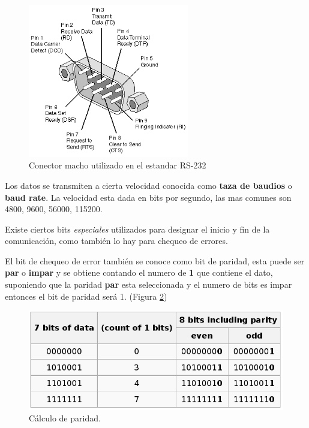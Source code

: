 \documentclass[11pt]{article}
\begin{document}
\begin{figure}[htb]
\centering
\includegraphics[width=7cm]{data/ee/9af60f-ed89-4c22-8d7b-e73cc7c9184d/screenshot-20160222-135017.png}
\caption{\label{fig:orgparagraph1}
Conector macho utilizado en el estandar RS-232}
\end{figure}

Los datos se transmiten a cierta velocidad conocida como \textbf{taza de
baudios} o \textbf{baud rate}. La velocidad esta dada en bits por segundo,
las mas comunes son 4800, 9600, 56000, 115200.

Existe ciertos bits \emph{especiales} utilizados para designar el inicio
y fin de la comunicación, como también lo hay para chequeo de
errores.

El bit de chequeo de error también se conoce como bit de paridad,
esta puede ser \textbf{par} o \textbf{impar} y se obtiene contando el numero de
\textbf{1} que contiene el dato, suponiendo que la paridad \textbf{par} esta
seleccionada y el numero de bits es impar entonces el bit de paridad
será 1. (Figura \ref{fig:orgparagraph2})

\begin{figure}[htb]
\centering
\includegraphics[width=.9\linewidth]{data/ee/9af60f-ed89-4c22-8d7b-e73cc7c9184d/screenshot-20160222-140423.png}
\caption{\label{fig:orgparagraph2}
Cálculo de paridad.}
\end{figure}
\end{document}
